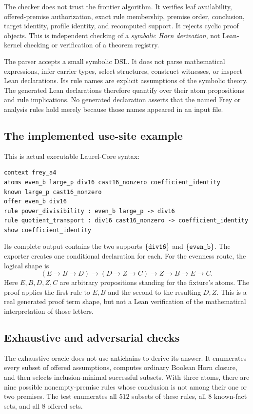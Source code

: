 \documentclass[11pt,a4paper]{article}
\newcommand{\code}[1]{\texttt{\detokenize{#1}}}
\theoremstyle{definition}
\theoremstyle{remark}
\begin{document}
The checker does not trust the frontier algorithm. It verifies leaf availability, offered-premise authorization, exact rule membership, premise order, conclusion, target identity, profile identity, and recomputed support. It rejects cyclic proof objects. This is independent checking of a \emph{symbolic Horn derivation}, not Lean-kernel checking or verification of a theorem registry.

The parser accepts a small symbolic DSL. It does not parse mathematical expressions, infer carrier types, select structures, construct witnesses, or inspect Lean declarations. Its rule names are explicit assumptions of the symbolic theory. The generated Lean declarations therefore quantify over their atom propositions and rule implications. No generated declaration asserts that the named Frey or analysis rules hold merely because those names appeared in an input file.

\subsection{The implemented use-site example}
This is actual executable Laurel-Core syntax:
\begin{lstlisting}
context frey_a4
atoms even_b large_p div16 cast16_nonzero coefficient_identity
known large_p cast16_nonzero
offer even_b div16
rule power_divisibility : even_b large_p -> div16
rule quotient_transport : div16 cast16_nonzero -> coefficient_identity
show coefficient_identity
\end{lstlisting}
Its complete output contains the two supports $\{\code{div16}\}$ and $\{\code{even_b}\}$. The exporter creates one conditional declaration for each. For the evenness route, the logical shape is
\[
 (E\to B\to D)\to(D\to Z\to C)\to Z\to B\to E\to C.
\]
Here $E,B,D,Z,C$ are arbitrary propositions standing for the fixture's atoms. The proof applies the first rule to $E,B$ and the second to the resulting $D,Z$. This is a real generated proof term shape, but not a Lean verification of the mathematical interpretation of those letters.

\subsection{Exhaustive and adversarial checks}
The exhaustive oracle does not use antichains to derive its answer. It enumerates every subset of offered assumptions, computes ordinary Boolean Horn closure, and then selects inclusion-minimal successful subsets. With three atoms, there are nine possible nonempty-premise rules whose conclusion is not among their one or two premises. The test enumerates all $512$ subsets of these rules, all $8$ known-fact sets, and all $8$ offered sets.
\end{document}
